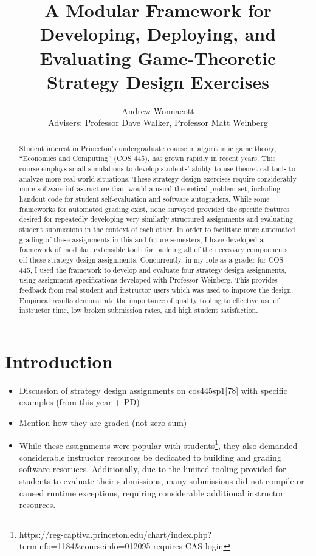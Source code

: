 \documentclass[pageno]{jpaper}
\begin{document}
\title{
A Modular Framework for Developing, Deploying, and Evaluating Game-Theoretic Strategy Design Exercises}

\author{Andrew Wonnacott\\
  Advisers: Professor Dave Walker, Professor Matt Weinberg}

\date{}
\maketitle

\thispagestyle{empty}
\doublespacing{}
\begin{abstract}
  Student interest in Princeton's undergraduate course in algorithmic game theory, ``Economics and Computing'' (COS 445), has grown rapidly in recent years.
  This course employs small simulations to develop students' ability to use theoretical tools to analyze more real-world situations.
  These strategy design exercises require considerably more software infrastructure than would a usual theoretical problem set, including handout code for student self-evaluation and software autograders.
  While some frameworks for automated grading exist, none surveyed provided the specific features desired for repeatedly developing very similarly structured assignments and evaluating student submissions in the context of each other.
  In order to facilitate more automated grading of these assignments in this and future semesters, I have developed a framework of modular, extensible tools for building all of the necessary compoenents oif these strategy design assignments.
  Concurrently, in my role as a grader for COS 445, I used the framework to develop and evaluate four strategy design assignments, using assignment specifications developed with Professor Weinberg.
  This provides feedback from real student and instructor users which was used to improve the design.
  Empirical results demonstrate the importance of quality tooling to effective use of instructor time, low broken submission rates, and high student satisfaction.
\end{abstract}

\newpage
\section*{Introduction}
\begin{itemize}
\item Discussion of strategy design assignments on cos445sp1[78] with specific examples (from this year + PD)
\item Mention how they are graded (not zero-sum)
\item While these assignments were popular with students\footnote{https://reg-captiva.princeton.edu/chart/index.php?terminfo=1184\&courseinfo=012095 requires CAS login}, they also demanded considerable instructor resources be dedicated to building and grading software resoruces. Additionally, due to the limited tooling provided for students to evaluate their submissions, many submissions did not compile or caused runtime exceptions, requiring considerable additional instructor resources.
\end{itemize}
\end{document}
